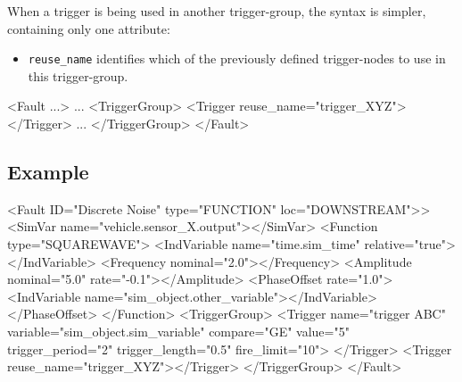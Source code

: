 \documentclass[11pt,fleqn]{report}
\begin{document}
When a trigger is being used in another trigger-group, the syntax is simpler,
containing only one attribute:
\begin{itemize}
 \item \verb"reuse_name" identifies which of the previously defined
   trigger-nodes to use in this trigger-group.
\end{itemize}
\begin{codeXML}
<Fault ...>
  ...
  <TriggerGroup>
    <Trigger reuse_name="trigger_XYZ"></Trigger>
    ...
  </TriggerGroup>
</Fault>
\end{codeXML}


\subsection{Example}
\begin{codeXML}
<Fault ID="Discrete Noise" type="FUNCTION" loc="DOWNSTREAM">>
  <SimVar name="vehicle.sensor_X.output"></SimVar>
  <Function type="SQUAREWAVE">
    <IndVariable name="time.sim_time" relative="true"></IndVariable>
    <Frequency nominal="2.0"></Frequency>
    <Amplitude nominal="5.0" rate="-0.1"></Amplitude>
    <PhaseOffset rate="1.0">
      <IndVariable name="sim_object.other_variable"></IndVariable>
    </PhaseOffset>
  </Function>
  <TriggerGroup>
    <Trigger name="trigger ABC" variable="sim_object.sim_variable"
      compare="GE" value="5" trigger_period="2" trigger_length="0.5"
      fire_limit="10">
    </Trigger>
    <Trigger reuse_name="trigger_XYZ"></Trigger>
  </TriggerGroup>
</Fault>
\end{codeXML}
\end{document}
